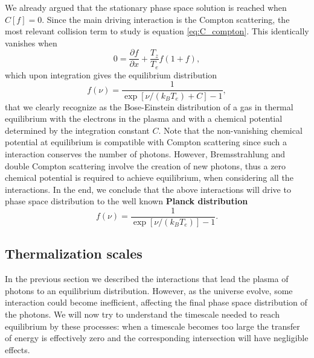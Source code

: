 We already argued that the stationary phase space solution is reached when $C[f]=0$. Since the main driving interaction is the Compton scattering, the most relevant collision term to study is equation \eqref{eq:C_compton}. This identically vanishes when
$$0=\frac{\partial f}{\partial x}+\frac{T_z}{T_e}f(1+f),$$
which upon integration gives the equilibrium distribution
$$f(\nu)=\frac{1}{\exp[\nu/(k_BT_e)+C]-1},$$
that we clearly recognize as the Bose-Einstein distribution of a gas in thermal equilibrium with the electrons in the plasma and with a chemical potential determined by the integration constant  $C$. Note that the non-vanishing chemical potential at equilibrium is compatible with Compton scattering since such a interaction conserves the number of photons. However, Bremsstrahlung and double Compton scattering involve the creation of new photons, thus a zero chemical potential is required to achieve equilibrium, when considering all the interactions. In the end, we conclude that the above interactions will drive to phase space distribution to the well known \textbf{Planck distribution}
$$f(\nu)=\frac{1}{\exp[\nu/(k_BT_e)]-1}.$$
\subsection{Thermalization scales}
\label{sec:ThermalizationScales}
In the previous section we described the interactions that lead the plasma of photons to an equilibrium distribution. However, as the universe evolve, some interaction could become inefficient, affecting the final phase space distribution of the photons. We will now try to understand the timescale needed to reach equilibrium by these processes: when a timescale becomes too large the transfer of energy is effectively zero and the corresponding intersection will have negligible effects.

